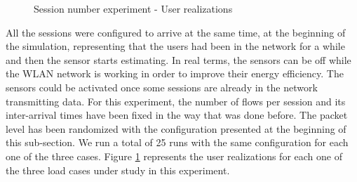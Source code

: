 \begin{figure}[h!]
	\centering
	\caption{Session number experiment - User realizations}
	\label{fig:user_realizations_final}
\end{figure}

All the sessions were configured to arrive at the same time, at the beginning of the simulation, representing that the users had been in the network for a while and then the sensor starts estimating. In real terms, the sensors can be off while the \acs{WLAN} network is working in order to improve their energy efficiency. The sensors could be activated once some sessions are already in the network transmitting data. For this experiment, the number of flows per session and its inter-arrival times have been fixed in the way that was done before. The packet level has been randomized with the configuration presented at the beginning of this sub-section. We run a total of 25 runs with the same configuration for each one of the three cases. Figure \ref{fig:user_realizations_final} represents the user realizations for each one of the three load cases under study in this experiment.


